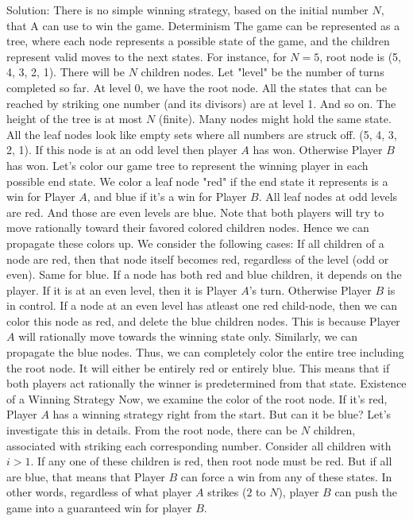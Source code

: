 \begin{enumerate}
Solution: There is no simple winning strategy, based on the initial number $N$, that A can use to win the game.
Determinism
The game can be represented as a tree, where each node represents a possible state of the game, and the children represent valid moves to the next states.
For instance, for $N=5$, root node is (5, 4, 3, 2, 1). There will be $N$ children nodes.
Let "level" be the number of turns completed so far.
At level $0$, we have the root node. All the states that can be reached by striking one number (and its divisors) are at level  1. And so on.
The height of the tree is at most $N$ (finite).
Many nodes might hold the same state. All the leaf nodes look like empty sets where all numbers are struck off. (5, 4, 3, 2, 1). If this node is at an odd level then player $A$ has won. Otherwise Player $B$ has won.
Let's color our game tree to represent the winning player in each possible end state. We color a leaf node "red" if the end state it represents is a win for Player $A$, and blue if it's a win for Player $B$. All leaf nodes at odd levels are red. And those are even levels are blue.
Note that both players will try to move rationally toward their favored colored children nodes. Hence we can propagate these colors up.
We consider the following cases:
If all children of a node are red, then that node itself becomes red, regardless of the level (odd or even). Same for blue.
If a node has both red and blue children, it depends on the player. If it is at an even level, then it is Player $A$'s turn. Otherwise Player $B$ is in control. If a node at an even level has atleast one red child-node, then we can color this node as red, and delete the blue children nodes. This is because Player $A$ will rationally move towards the winning state only. Similarly, we can propagate the blue nodes.
Thus, we can completely color the entire tree including the root node. It will either be entirely red or entirely blue.
This means that if both players act rationally the winner is predetermined from that state.
Existence of a Winning Strategy
Now, we examine the color of the root node. If it's red, Player $A$ has a winning strategy right from the start. But can it be blue?
Let's investigate this in details.
From the root node, there can be $N$ children, associated with striking each corresponding number. Consider all children with $i>1$. If any one of these children is red, then root node must be red. But if all are blue, that means that Player $B$ can force a win from any of these states. In other words, regardless of what player $A$ strikes ($2$ to $N$), player $B$ can push the game into a guaranteed  win for player $B$.

\end{enumerate}
